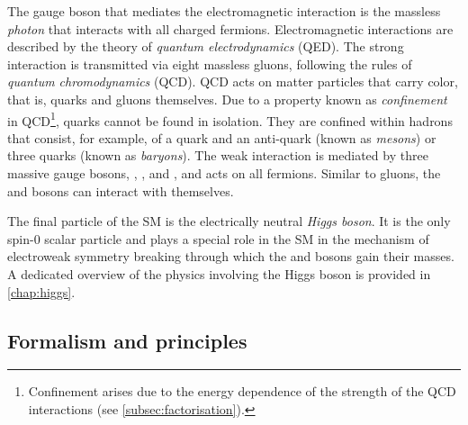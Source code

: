 The gauge boson that mediates the electromagnetic interaction is the massless \emph{photon} that interacts with all charged fermions. Electromagnetic interactions are described by the theory of \emph{quantum electrodynamics} (QED). The strong interaction is transmitted via eight massless gluons, following the rules of \emph{quantum chromodynamics} (QCD). QCD acts on matter particles that carry color, that is, quarks and gluons themselves.
Due to a property known as \emph{confinement} in QCD\footnote{Confinement arises due to the energy dependence of the strength of the QCD interactions (see \cref{subsec:factorisation}).}, quarks cannot be found in isolation. They are confined within hadrons that consist, for example, of a quark and an anti-quark (known as \emph{mesons}) or three quarks (known as \emph{baryons}).
The weak interaction is mediated by three massive gauge bosons, \Wplus, \Wminus, and \Zboson, and acts on all fermions. Similar to gluons, the \Wpm and \Zboson bosons can interact with themselves.

The final particle of the SM is the electrically neutral \emph{Higgs boson}. It is the only spin-0 scalar particle and plays a special role in the SM in the mechanism of electroweak symmetry breaking through which the \Wpm and \Zboson bosons gain their masses. A dedicated overview of the physics involving the Higgs boson is provided in \cref{chap:higgs}.


\subsection{Formalism and principles}
\label{subsec:formalism}


